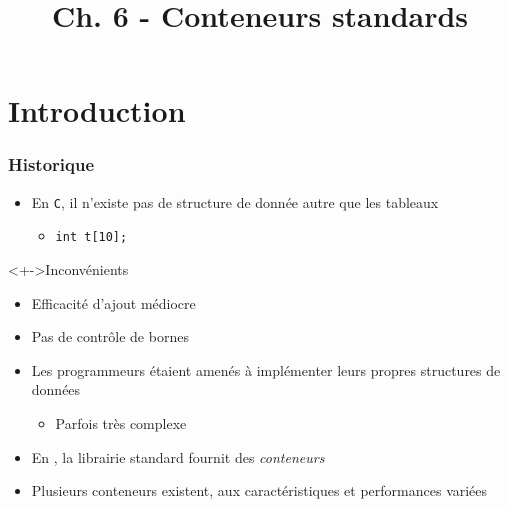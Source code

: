 


\title{Ch. 6 - Conteneurs standards}




\section{Introduction}

\begin{frame}
\frametitle{Historique}
\begin{itemize}[<+->]
\item En \texttt{C}, il n'existe pas de structure de donnée autre que les tableaux
	\begin{itemize}
	\item \lstinline|int t[10];|
	\end{itemize}
\end{itemize}
\begin{alertblock}<+->{Inconvénients}
	\begin{itemize}[<+->]
	\item Efficacité d'ajout médiocre
	\item Pas de contrôle de bornes
	\end{itemize}
\end{alertblock}
\begin{itemize}[<+->]
\item Les programmeurs étaient amenés à implémenter leurs propres structures de données
	\begin{itemize}
	\item Parfois très complexe
	\end{itemize}
\item En \cpp, la librairie standard fournit des \emph{conteneurs}
\item Plusieurs conteneurs existent, aux caractéristiques et performances variées
\end{itemize}
\end{frame}

